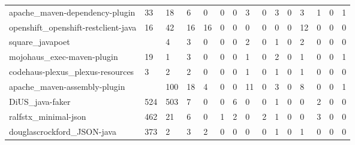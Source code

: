 \begin{table}[]
\begin{tabular}{lllllllllllllll}
        apache\_maven-dependency-plugin      & 33    & 18                & 6                  & 0                    & 0                      & 0                     & 3                    & 0                      & 3                     & 0  & 3  & 1  & 0  & 1  \\
        openshift\_openshift-restclient-java & 16    & 42                & 16                 & 16                   & 0                      & 0                     & 0                    & 0                      & 0                     & 0  & 12 & 0  & 0  & 0  \\
        square\_javapoet                     &       & 4                 & 3                  & 0                    & 0                      & 0                     & 2                    & 0                      & 1                     & 0  & 2  & 0  & 0  & 0  \\
        mojohaus\_exec-maven-plugin          & 19    & 1                 & 3                  & 0                    & 0                      & 0                     & 1                    & 0                      & 2                     & 0  & 1  & 0  & 0  & 1  \\
        codehaus-plexus\_plexus-resources    & 3     & 2                 & 2                  & 0                    & 0                      & 0                     & 1                    & 0                      & 1                     & 0  & 1  & 0  & 0  & 0  \\
        apache\_maven-assembly-plugin        &      & 100               & 18                 & 4                    & 0                      & 0                     & 11                   & 0                      & 3                     & 0  & 8  & 0  & 0  & 1  \\
        DiUS\_java-faker                     & 524   & 503               & 7                  & 0                    & 0                      & 6                     & 0                    & 0                      & 1                     & 0  & 0  & 2  & 0  & 0  \\
        ralfstx\_minimal-json                & 462   & 21                & 6                  & 0                    & 1                      & 2                     & 0                    & 2                      & 1                     & 0  & 0  & 3  & 0  & 0  \\
        douglascrockford\_JSON-java          & 373   & 2                 & 3                  & 2                    & 0                      & 0                     & 0                    & 0                      & 1                     & 0  & 1  & 0  & 0  & 0  \\

\end{tabular}
\end{table}
